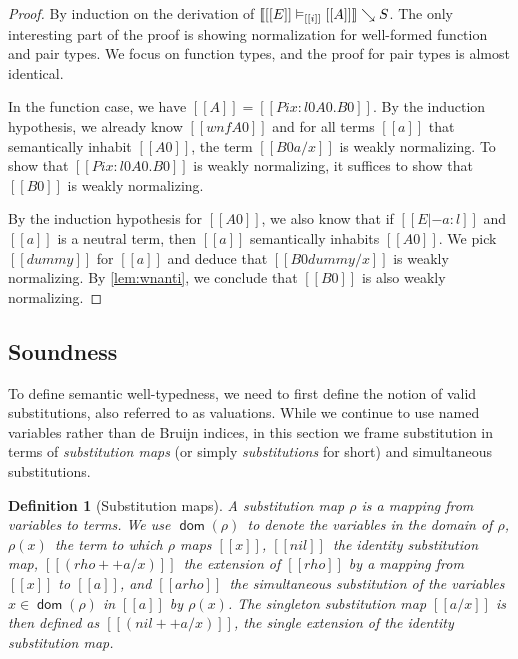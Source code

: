 \documentclass[acmsmall]{acmart}
\theoremstyle{linked}
\theoremstyle{deflinked}
\theoremstyle{acmdefinition}
\newtheorem{nolinkdef}[thm]{Definition}
\DeclarePairedDelimiter{\bracks}{\llbracket}{\rrbracket}
\newcommand{\interp}[4]{\bracks{#1 \vDash_{#2} #3} \searrow #4}
\newcommand{\dom}{\mathop{\mathsf{dom}}}
\begin{document}
\begin{proof}
  By induction on the derivation of
  $\interp{[[E]]}{[[i]]}{[[A]]}{S}$.
  The only interesting part of the proof is showing normalization for
  well-formed function and pair
  types. We focus on function types, and the proof for pair types is
  almost identical.

  In the function case, we have $[[A]] = [[Pi x : l0 A0 . B0]]$. By
  the induction hypothesis, we already know $[[wnf A0]]$ and for all
  terms $[[a]]$ that semantically inhabit $[[A0]]$, the term $[[B0 {a
    / x}]]$ is weakly normalizing. To show that $[[Pi x : l0 A0. B0]]$
  is weakly normalizing, it suffices to show that $[[B0]]$ is weakly
  normalizing.

  By the induction hypothesis for $[[A0]]$, we also know that
  if $[[E |- a : l]]$ and $[[a]]$ is a neutral term, then $[[a]]$
  semantically inhabits $[[A0]]$. We pick $[[dummy]]$
  for $[[a]]$ and deduce that $[[B0 {dummy / x}]]$ is weakly
  normalizing. By \cref{lem:wnanti}, we conclude that $[[B0]]$ is
  also weakly normalizing.
\end{proof}

\subsection{Soundness}
\label{sec:soundness}
To define semantic well-typedness, we need to first define the notion
of valid substitutions, also referred to as valuations.
While we continue to use named variables rather than de Bruijn indices,
in this section we frame substitution in terms of \emph{substitution maps}
(or simply \emph{substitutions} for short)
and simultaneous substitutions.

\begin{nolinkdef}[Substitution maps]
  A substitution map $\rho$ is a mapping from variables to terms.
  We use $\dom(\rho)$~to denote the variables in the domain of $\rho$,
  $\rho(x)$~the term to which $\rho$ maps $[[x]]$,
  $[[nil]]$~the identity substitution map,
  $[[(rho ++ { a / x })]]$~the extension of $[[rho]]$
  by a mapping from $[[x]]$ to $[[a]]$,
  and $[[a { rho }]]$~the simultaneous substitution
  of the variables $x \in \dom(\rho)$ in $[[a]]$ by $\rho(x)$.
  The singleton substitution map $[[{ a / x }]]$
  is then defined as $[[(nil ++ { a / x })]]$,
  the single extension of the identity substitution map.
\end{nolinkdef}
\end{document}

